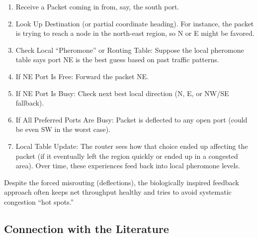 \documentclass[../../../OAE-SPEC-MAIN.tex]{subfiles}
\begin{document}
\begin{enumerate}
\item		Receive a Packet coming in from, say, the south port.
\item		Look Up Destination (or partial coordinate heading). For instance, the packet is trying to reach a node in the north-east region, so N or E might be favored.
\item		Check Local “Pheromone” or Routing Table: Suppose the local pheromone table says port NE is the best guess based on past traffic patterns.
\item		If NE Port Is Free: Forward the packet NE.
\item		If NE Port Is Busy: Check next best local direction (N, E, or NW/SE fallback).
\item		If All Preferred Ports Are Busy: Packet is deflected to any open port (could be even SW in the worst case).
\item		Local Table Update: The router sees how that choice ended up affecting the packet (if it eventually left the region quickly or ended up in a congested area). Over time, these experiences feed back into local pheromone levels.
\end{enumerate}

Despite the forced misrouting (deflections), the biologically inspired feedback approach often keeps net throughput healthy and tries to avoid systematic congestion ``hot spots.''

\subsection{Connection with the Literature}%
\end{document}
